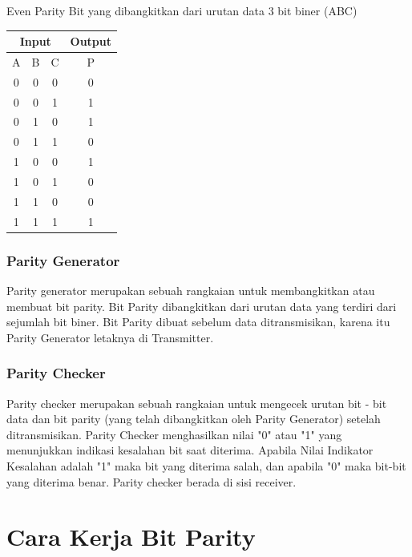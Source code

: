 Even Parity Bit yang dibangkitkan dari urutan data 3 bit biner (ABC)
\begin{table}[h!]
\begin{tabular}{|c|c|c|c|}
\hline
\multicolumn{3}{|c|}{Input} & Output\\
\hline
A & B & C & P\\
\hline
0 & 0 & 0 & 0\\
\hline
0 & 0 & 1 & 1\\
\hline
0 & 1 & 0 & 1\\
\hline
0 & 1 & 1 & 0\\
\hline
1 & 0 & 0 & 1\\
\hline
1 & 0 & 1 & 0\\
\hline
1 & 1 & 0 & 0\\
\hline
1 & 1 & 1 & 1\\
\hline
\end{tabular}
\end{table}

\subsubsection{Parity Generator}

Parity generator merupakan sebuah rangkaian untuk membangkitkan atau membuat bit parity. Bit Parity dibangkitkan dari urutan data yang terdiri dari sejumlah bit biner. Bit Parity dibuat sebelum data ditransmisikan, karena itu Parity Generator letaknya di Transmitter.

\subsubsection{Parity Checker}

Parity checker merupakan sebuah rangkaian untuk mengecek urutan bit - bit data dan bit parity (yang telah dibangkitkan oleh Parity Generator) setelah ditransmisikan. Parity Checker menghasilkan nilai "0" atau "1" yang menunjukkan indikasi kesalahan bit saat diterima. Apabila Nilai Indikator Kesalahan adalah "1" maka bit yang diterima salah, dan apabila "0" maka bit-bit yang diterima benar. Parity checker berada di sisi receiver.

\section{Cara Kerja Bit Parity}
